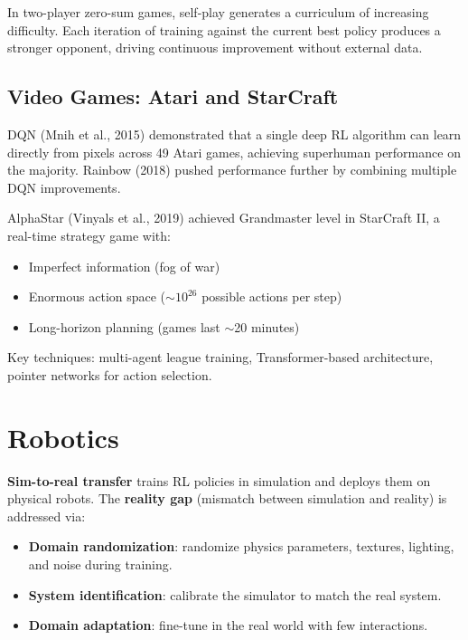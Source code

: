 \begin{proposition}
In two-player zero-sum games, self-play generates a curriculum of
increasing difficulty. Each iteration of training against the current
best policy produces a stronger opponent, driving continuous improvement
without external data.
\end{proposition}

\subsection{Video Games: Atari and StarCraft}

\begin{example}
DQN (Mnih et al., 2015) demonstrated that a single deep RL algorithm
can learn directly from pixels across 49 Atari games, achieving
superhuman performance on the majority. Rainbow (2018) pushed
performance further by combining multiple DQN improvements.
\end{example}

\begin{example}
AlphaStar (Vinyals et al., 2019) achieved Grandmaster level in
StarCraft II, a real-time strategy game with:
\begin{itemize}
    \item Imperfect information (fog of war)
    \item Enormous action space ($\sim 10^{26}$ possible actions per step)
    \item Long-horizon planning (games last $\sim$20 minutes)
\end{itemize}
Key techniques: multi-agent league training, Transformer-based
architecture, pointer networks for action selection.
\end{example}

\section{Robotics}
\label{sec:app:robotics}

\begin{definition}
\textbf{Sim-to-real transfer} trains RL policies in simulation and
deploys them on physical robots. The \textbf{reality gap} (mismatch
between simulation and reality) is addressed via:
\begin{itemize}
    \item \textbf{Domain randomization}: randomize physics parameters,
    textures, lighting, and noise during training.
    \item \textbf{System identification}: calibrate the simulator to
    match the real system.
    \item \textbf{Domain adaptation}: fine-tune in the real world with
    few interactions.
\end{itemize}
\end{definition}

